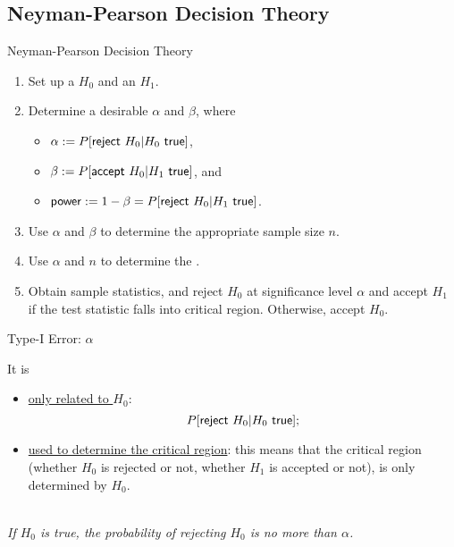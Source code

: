 \subsection{Neyman-Pearson Decision Theory}

\begin{frame}{Neyman-Pearson Decision Theory}

\begin{enumerate}
	\justifying
	\item Set up a  $H_0$ and an  $H_1$.
	\item Determine a desirable $\alpha$ and $\beta$, where
	\begin{itemize}
		\item $\alpha := P[\U{reject\ } H_0|H_0 \U{\ true}]$,
		\item $\beta := P[\U{accept\ } H_0|H_1 \U{\ true}]$, and
		\item $\U{power} := 1 - \beta = P[\U{reject\ } H_0|H_1 \U{\ true}]$.
	\end{itemize}
	\item Use $\alpha$ and $\beta$ to determine the appropriate sample size $n$. 
	\item Use $\alpha$ and $n$ to determine the . 
	\item Obtain sample statistics, and reject $H_0$ at significance level $\alpha$ and accept $H_1$ if the test statistic falls into critical region. Otherwise, accept $H_0$.
\end{enumerate}

\end{frame}

\begin{frame}{Type-I Error: $\alpha$}

\justifying
{} It is
\begin{itemize}
	\justifying
	\item \underline{only related to $H_0$}: $$P[\U{reject\ } H_0|H_0\U{\ true}];$$
	\item \underline{used to determine the critical region}: this means that the critical region (whether $H_0$ is rejected or not, whether $H_1$ is accepted or not), is only determined by $H_0$.
\end{itemize}
~\\
\highlightr{$\Delta$} \emph{If $H_0$ is true, the probability of rejecting $H_0$ is no more than $\alpha$.} \\


\end{frame}


